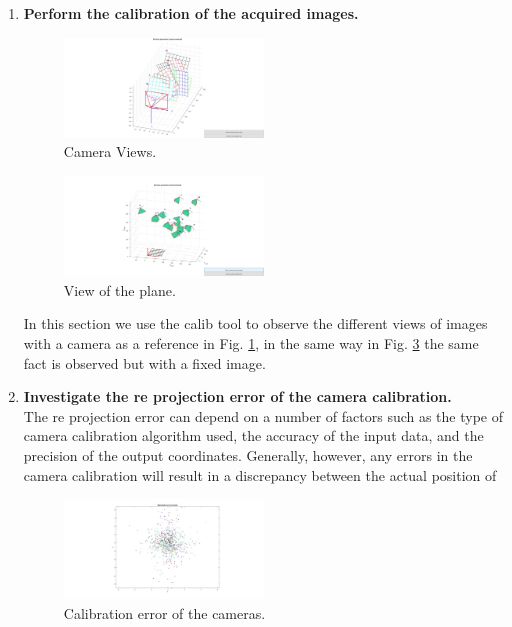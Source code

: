\documentclass[12pt, twoside]{report}
\begin{document}
\begin{enumerate}
    \item \textbf{Perform the calibration of the acquired images.}

    \begin{figure}[H]
    \centering
    \includegraphics[width=0.5\textwidth]{images/camera_views.jpg}
    \caption{Camera Views.}
    \label{fig:fig1_cal}
    \end{figure}
    
    \begin{figure}[H]
    \centering
    \includegraphics[width=0.5\textwidth]{images/3dcv_cameras.jpg}
    \caption{View of the plane.}
    \label{fig:fig2_cal}
    \end{figure}
    In this section we use the calib tool to observe the different views of images with a camera as a reference in Fig. \ref{fig:fig1_cal}, in the same way in Fig. \ref{fig:fig2_cal} the same fact is observed but with a fixed image.

    \item \textbf{Investigate the re projection error of the camera calibration.}\\
The re projection error can depend on a number of factors such as the type of camera calibration algorithm used, the accuracy of the input data, and the precision of the output coordinates. Generally, however, any errors in the camera calibration will result in a discrepancy between the actual position of
    \begin{figure}[H]
        \centering
        \includegraphics[width=0.5\textwidth]{images/error1.jpg}
        \caption{Calibration error of the cameras.}
        \label{fig:fig2_cal}
    \end{figure}
    

\end{enumerate}
\end{document}
